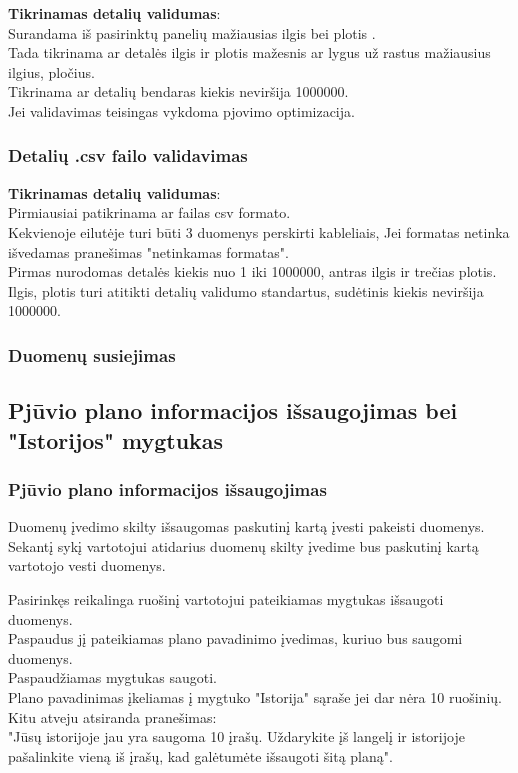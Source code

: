 \documentclass[a4paper,12pt]{article}
\begin{document}
\textbf{Tikrinamas detalių validumas}:\\
	Surandama iš pasirinktų panelių mažiausias ilgis bei plotis .\\
	Tada tikrinama ar detalės ilgis ir plotis mažesnis ar lygus už rastus mažiausius ilgius, pločius.\\
	Tikrinama ar detalių bendaras kiekis neviršija 1000000. \\

Jei validavimas teisingas vykdoma pjovimo optimizacija.

\subsubsection{Detalių .csv failo validavimas}
\textbf{Tikrinamas detalių validumas}:\\
	Pirmiausiai patikrinama ar failas csv formato. \\
	Kekvienoje eilutėje turi būti 3 duomenys perskirti kableliais, Jei formatas netinka 
	išvedamas pranešimas "netinkamas formatas". \\
	Pirmas nurodomas detalės kiekis nuo 1 iki 1000000, antras ilgis ir trečias plotis. \\
	Ilgis, plotis turi atitikti detalių validumo standartus, sudėtinis kiekis neviršija 1000000.\\
	


\subsubsection{Duomenų susiejimas}





\subsection{ Pjūvio plano informacijos išsaugojimas bei "Istorijos" mygtukas}
\subsubsection{Pjūvio plano informacijos išsaugojimas}
Duomenų įvedimo skilty išsaugomas paskutinį kartą įvesti pakeisti duomenys.\\
Sekantį sykį vartotojui atidarius duomenų skilty įvedime bus paskutinį kartą vartotojo vesti duomenys.

Pasirinkęs reikalinga ruošinį vartotojui pateikiamas mygtukas išsaugoti duomenys. \\
Paspaudus jį pateikiamas plano pavadinimo įvedimas, kuriuo bus saugomi duomenys. \\
Paspaudžiamas mygtukas saugoti. \\
Plano pavadinimas įkeliamas į mygtuko "Istorija" sąraše jei dar nėra 10 ruošinių.\\
Kitu atveju atsiranda pranešimas: \\
"Jūsų istorijoje jau yra saugoma 10 įrašų. Uždarykite įš langelį ir istorijoje pašalinkite vieną iš įrašų, kad galėtumėte išsaugoti šitą planą". \\
\end{document}
